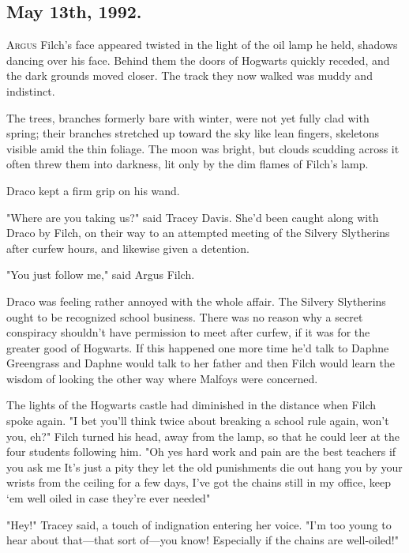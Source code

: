 
\subsection{May 13th, 1992.}

\lettrine{A}{rgus} Filch's face appeared twisted in the light of the oil lamp he held,
shadows dancing over his face. Behind them the doors of Hogwarts quickly
receded, and the dark grounds moved closer. The track they now walked was muddy
and indistinct.

The trees, branches formerly bare with winter, were not yet fully clad with
spring; their branches stretched up toward the sky like lean fingers, skeletons
visible amid the thin foliage. The moon was bright, but clouds scudding across
it often threw them into darkness, lit only by the dim flames of Filch's lamp.

Draco kept a firm grip on his wand.

"Where are you taking us?" said Tracey Davis. She'd been caught along with
Draco by Filch, on their way to an attempted meeting of the Silvery Slytherins
after curfew hours, and likewise given a detention.

"You just follow me," said Argus Filch.

Draco was feeling rather annoyed with the whole affair. The Silvery Slytherins
ought to be recognized school business. There was no reason why a secret
conspiracy shouldn't have permission to meet after curfew, if it was for the
greater good of Hogwarts. If this happened one more time he'd talk to Daphne
Greengrass and Daphne would talk to her father and then Filch would learn the
wisdom of looking the other way where Malfoys were concerned.

The lights of the Hogwarts castle had diminished in the distance when Filch
spoke again. "I bet you'll think twice about breaking a school rule again,
won't you, eh?" Filch turned his head, away from the lamp, so that he could
leer at the four students following him. "Oh yes{\el} hard work and pain are
the best teachers if you ask me{\el} It's just a pity they let the old
punishments die out{\el} hang you by your wrists from the ceiling for a few
days, I've got the chains still in my office, keep `em well oiled in case
they're ever needed{\el}"

"Hey!" Tracey said, a touch of indignation entering her voice. "I'm too young
to hear about that---that sort of---you know! Especially if the chains are
well-oiled!"

